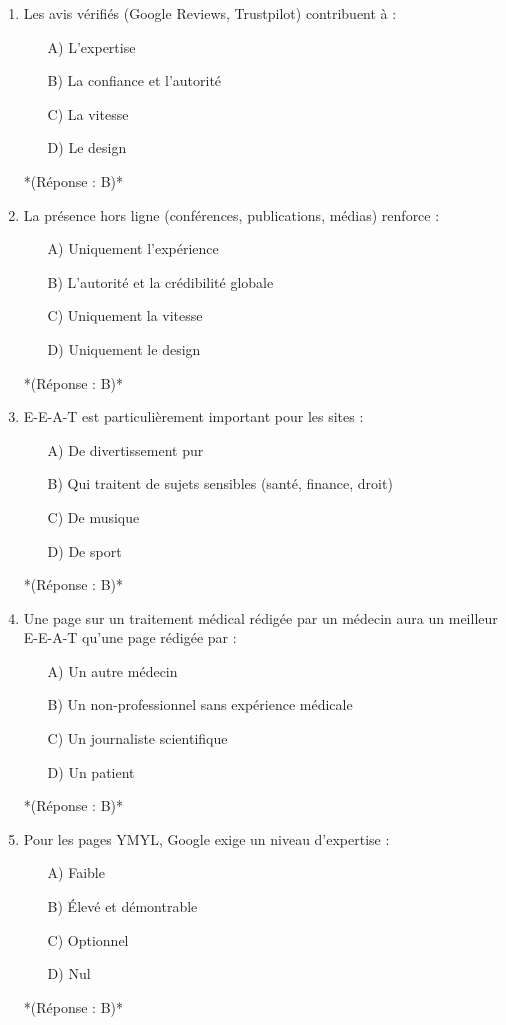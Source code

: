 \documentclass[12pt,a4paper,twoside]{report}
\begin{document}
\begin{enumerate}
\item Les avis vérifiés (Google Reviews, Trustpilot) contribuent à :
\begin{itemize}
\item[A)] L'expertise
\item[B)] La confiance et l'autorité
\item[C)] La vitesse
\item[D)] Le design
\end{itemize}
*(Réponse : B)*

\item La présence hors ligne (conférences, publications, médias) renforce :
\begin{itemize}
\item[A)] Uniquement l'expérience
\item[B)] L'autorité et la crédibilité globale
\item[C)] Uniquement la vitesse
\item[D)] Uniquement le design
\end{itemize}
*(Réponse : B)*

\item E-E-A-T est particulièrement important pour les sites :
\begin{itemize}
\item[A)] De divertissement pur
\item[B)] Qui traitent de sujets sensibles (santé, finance, droit)
\item[C)] De musique
\item[D)] De sport
\end{itemize}
*(Réponse : B)*

\item Une page sur un traitement médical rédigée par un médecin aura un meilleur E-E-A-T qu'une page rédigée par :
\begin{itemize}
\item[A)] Un autre médecin
\item[B)] Un non-professionnel sans expérience médicale
\item[C)] Un journaliste scientifique
\item[D)] Un patient
\end{itemize}
*(Réponse : B)*

\item Pour les pages YMYL, Google exige un niveau d'expertise :
\begin{itemize}
\item[A)] Faible
\item[B)] Élevé et démontrable
\item[C)] Optionnel
\item[D)] Nul
\end{itemize}
*(Réponse : B)*


\end{enumerate}
\end{document}

